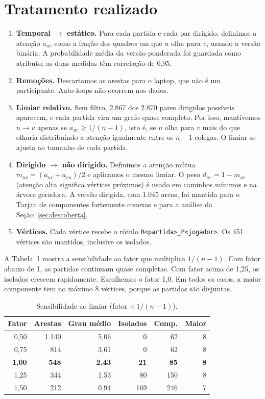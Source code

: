 \documentclass[sigconf]{acmart}
\begin{document}
\section{Tratamento realizado}

\begin{enumerate}
  \item \textbf{Temporal $\rightarrow$ estático.} Para cada partida e cada par dirigido, definimos a
  atenção $a_{uv}$ como a fração dos quadros em que $u$ olha para $v$, usando a versão binária.
  A probabilidade média da versão ponderada foi guardada como atributo; as duas medidas têm
  correlação de 0,95.
  \item \textbf{Remoções.} Descartamos as arestas para o laptop, que não é um participante. Auto-loops
  não ocorrem nos dados.
  \item \textbf{Limiar relativo.} Sem filtro, 2.867 dos 2.870 pares dirigidos possíveis aparecem, e
  cada partida vira um grafo quase completo. Por isso, mantivemos $u \rightarrow v$ apenas se
  $a_{uv} \ge 1/(n-1)$, isto é, se $u$ olha para $v$ mais do que olharia distribuindo a atenção
  igualmente entre os $n-1$ colegas. O limiar se ajusta ao tamanho de cada partida.
  \item \textbf{Dirigido $\rightarrow$ não dirigido.} Definimos a atenção mútua
  $m_{uv} = (a_{uv}+a_{vu})/2$ e aplicamos o mesmo limiar. O peso $d_{uv} = 1 - m_{uv}$ (atenção alta
  significa vértices próximos) é usado em caminhos mínimos e na árvore geradora. A versão dirigida,
  com 1.045 arcos, foi mantida para o Tarjan de componentes fortemente conexas e para a análise da
  Seção~\ref{sec:descoberta}.
  \item \textbf{Vértices.} Cada vértice recebe o rótulo \texttt{R<partida>\_P<jogador>}. Os 451 vértices
  são mantidos, inclusive os isolados.
\end{enumerate}

A Tabela~\ref{tab:limiar} mostra a sensibilidade ao fator que multiplica $1/(n-1)$. Com fator abaixo
de 1, as partidas continuam quase completas. Com fator acima de 1,25, os isolados crescem rapidamente.
Escolhemos o fator 1,0. Em todos os casos, a maior componente tem no máximo 8 vértices, porque as
partidas são disjuntas.

\begin{table}[t]
\caption{Sensibilidade ao limiar (fator $\times\,1/(n-1)$).}
\label{tab:limiar}
\small
\begin{tabular}{rrrrrr}
\toprule
Fator & Arestas & Grau médio & Isolados & Comp. & Maior \\
\midrule
0,50 & 1.140 & 5,06 & 0 & 62 & 8 \\
0,75 & 814 & 3,61 & 0 & 62 & 8 \\
\textbf{1,00} & \textbf{548} & \textbf{2,43} & \textbf{21} & \textbf{85} & \textbf{8} \\
1,25 & 344 & 1,53 & 80 & 150 & 8 \\
1,50 & 212 & 0,94 & 169 & 246 & 7 \\
\bottomrule
\end{tabular}
\end{table}
\end{document}

